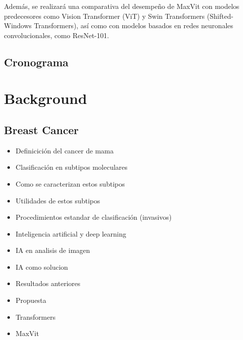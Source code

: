 \documentclass[a4paper,10pt]{book}
\begin{document}
Además, se realizará una comparativa del desempeño de MaxVit con modelos predecesores como Vision Transformer (ViT) y Swin Transformers (Shifted-Windows Transformers), así como con modelos basados en redes neuronales convolucionales, como ResNet-101.



\section{Cronograma}


\chapter{Background}

\section{Breast Cancer}


\begin{itemize}
  \item Definicición del cancer de mama
    \item Clasificación en subtipos moleculares
    \item Como se caracterizan estos subtipos
     \item Utilidades de estos subtipos
      \item Procedimientos estandar de clasificación (invasivos)
       \item Inteligencia artificial y deep learning
        \item IA en analisis de imagen
         \item IA como solucion
          \item Resultados anteriores
           \item Propuesta
            \item Transformers
             \item MaxVit
\end{itemize}


\backmatter
{}


\end{document}

